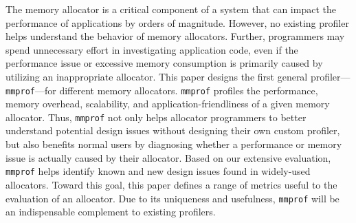 The memory allocator is a critical component of a system that can impact the performance of applications by orders of magnitude. However, no existing profiler helps understand the behavior of memory allocators. Further, programmers may spend unnecessary effort in investigating application code, even if the performance issue or excessive memory consumption is primarily caused by utilizing an inappropriate allocator. This paper designs the first general profiler---\texttt{mmprof}---for different memory allocators. \texttt{mmprof} profiles the performance, memory overhead, scalability, and application-friendliness of a given memory allocator. Thus, \texttt{mmprof} not only helps allocator programmers to better understand potential design issues without designing their own custom profiler, but also benefits normal users by diagnosing whether a performance or memory issue is actually caused by their allocator. Based on our extensive evaluation, \texttt{mmprof} helps identify known and new design issues found in widely-used allocators. Toward this goal, this paper defines a range of metrics useful to the evaluation of an allocator. Due to its uniqueness and usefulness, \texttt{mmprof} will be an indispensable complement to existing profilers. 


 